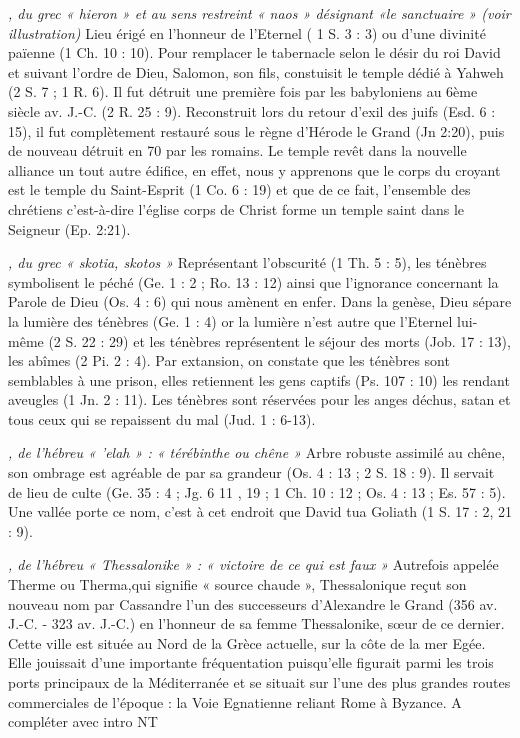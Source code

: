 \begin{multicols}{2}
\textit{, du grec « hieron » et au sens restreint « naos » désignant «le sanctuaire » (voir illustration)}\newline
Lieu érigé en l'honneur de l'Eternel ( 1 S. 3 : 3) ou d'une divinité païenne (1 Ch. 10 : 10). Pour remplacer le tabernacle selon le désir du roi David et suivant l'ordre de Dieu, Salomon, son fils, constuisit le temple dédié à Yahweh (2 S. 7 ; 1 R. 6). Il fut détruit une première fois par les babyloniens au 6ème siècle av. J.-C. (2 R. 25 : 9). Reconstruit lors du retour d'exil des juifs (Esd. 6 : 15), il fut complètement restauré sous le règne d'Hérode le Grand (Jn 2:20), puis de nouveau détruit en 70 par les romains. Le temple revêt dans la nouvelle alliance un tout autre édifice, en effet, nous y apprenons que le corps du croyant est le temple du Saint-Esprit (1 Co. 6 : 19) et que de ce fait, l'ensemble des chrétiens c'est-à-dire l'église corps de Christ forme un temple saint dans le Seigneur (Ep. 2:21).

\textit{, du grec « skotia, skotos »}\newline
Représentant l'obscurité (1 Th. 5 : 5), les ténèbres symbolisent le péché (Ge. 1 : 2 ; Ro. 13 : 12) ainsi que l'ignorance concernant la Parole de Dieu (Os. 4 : 6) qui nous amènent en enfer. Dans la genèse, Dieu sépare la lumière des ténèbres (Ge. 1 : 4) or la lumière n'est autre que l'Eternel lui-même (2 S. 22 : 29) et les ténèbres représentent le séjour des morts (Job. 17 : 13), les abîmes (2 Pi. 2 : 4). Par extansion, on constate que les ténèbres sont semblables à une prison, elles retiennent les gens captifs (Ps. 107 : 10) les rendant aveugles (1 Jn. 2 : 11). Les ténèbres sont réservées pour les anges déchus, satan et tous ceux qui se repaissent du mal (Jud. 1 : 6-13).

\textit{, de l'hébreu « 'elah » : « térébinthe ou chêne »}\newline
Arbre robuste assimilé au chêne, son ombrage est agréable de par sa grandeur (Os. 4 : 13 ; 2 S. 18 : 9). Il servait de lieu de culte (Ge. 35 : 4 ; Jg. 6 11 , 19 ; 1 Ch. 10 : 12 ; Os. 4 : 13 ; Es. 57 : 5). Une vallée porte ce nom, c'est à cet endroit que David tua Goliath (1 S. 17 : 2, 21 : 9).

\textit{, de l'hébreu « Thessalonike » : « victoire de ce qui est faux »}\newline
Autrefois appelée Therme ou Therma,qui signifie « source chaude », Thessalonique reçut son nouveau nom par Cassandre l’un des successeurs d’Alexandre le Grand (356 av. J.-C. - 323 av. J.-C.) en l’honneur de sa femme Thessalonike, sœur de ce dernier. Cette ville est située au Nord de la Grèce actuelle, sur la côte de la mer Egée. Elle jouissait d’une importante fréquentation puisqu’elle figurait parmi les trois ports principaux de la Méditerranée et se situait sur l’une des plus grandes routes commerciales de l’époque : la Voie Egnatienne reliant Rome à Byzance. A compléter avec intro NT


\end{multicols}
